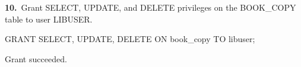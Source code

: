 \noindent\begin{minipage}{\linewidth}
\begingroup{}
{\fontsize{14}{17}\selectfont\textbf{10.}}\ Grant SELECT, UPDATE, and DELETE privileges on the BOOK\_COPY table to user LIBUSER.\par
\endgroup\vspace{12pt}


\begin{sqlcode}
GRANT SELECT, UPDATE, DELETE ON book_copy TO libuser;
\end{sqlcode}

\vspace{18pt}


\begin{sqlout}[fontsize=\small]
Grant succeeded.
\end{sqlout}
\end{minipage}\par\vspace{24pt}

